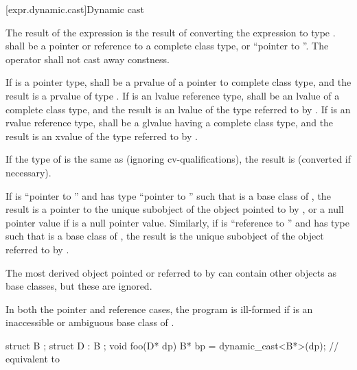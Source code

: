 [expr.dynamic.cast]{Dynamic cast}

\pnum
{}%
%
The result of the expression  is the result of
converting the expression  to type .
%
 shall be a pointer or reference to a complete class type, or
``pointer to \cv{} ''. The  operator shall not cast
away constness.

\pnum
If  is a pointer type,  shall be a prvalue of a
pointer to complete class type, and the result is a prvalue of type
. If  is an lvalue reference type,  shall be
an lvalue of a complete class type, and the result is an lvalue of the
type referred to by . If  is an rvalue reference type,
 shall be a glvalue having a complete class type, and the
result is an xvalue of the type referred to by .

\pnum
If the type of  is the same as  (ignoring cv-qualifications),
the result is
 (converted if necessary).

\pnum
If  is ``pointer to  '' and  has
type ``pointer to  '' such that  is a base
class of , the result is a pointer to the unique 
subobject of the  object pointed to by , or
a null pointer value if  is a null pointer value.
Similarly, if
 is ``reference to  '' and  has
type   such that  is a base class of
, the result is the unique  subobject of the 
object referred to by .
\begin{footnote}
The most derived
object pointed or referred to by
 can contain other  objects as base classes, but these
are ignored.
\end{footnote}
In both the pointer and
reference cases, the program is ill-formed if  is an inaccessible or
ambiguous base class of .
\begin{example}
\begin{codeblock}
struct B { };
struct D : B { };
void foo(D* dp) {
  B*  bp = dynamic_cast<B*>(dp);    // equivalent to 
}
\end{codeblock}
\end{example}

